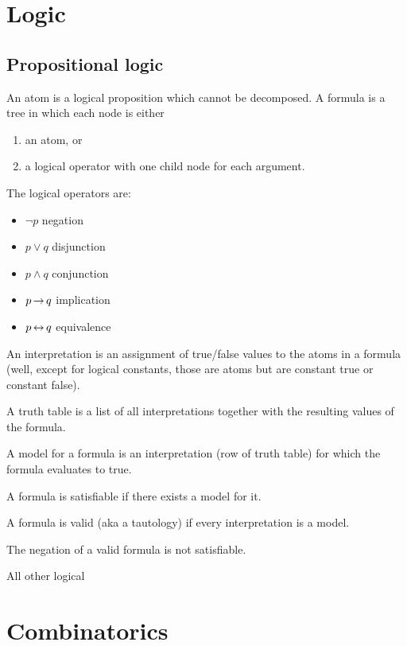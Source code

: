 
\section{Logic}
\subsection{Propositional logic}

\begin{definition*}
  An atom is a logical proposition which cannot be decomposed. A formula is a tree in which each
  node is either
  \begin{enumerate}
  \item an atom, or
  \item a logical operator with one child node for each argument.
  \end{enumerate}
  The logical operators are:
  \begin{itemize}
  \item $\lnot p$ negation
  \item $p \lor q$ disjunction
  \item $p \land q$ conjunction
  \item $p \operatorname{\rightarrow} q$ implication
  \item $p \operatorname{\leftrightarrow} q$ equivalence
  \end{itemize}
  An interpretation is an assignment of true/false values to the atoms in a formula (well, except
  for logical constants, those are atoms but are constant true or constant false).

  A truth table is a list of all interpretations together with the resulting values of the formula.

  A model for a formula is an interpretation (row of truth table) for which the formula evaluates
  to true.

  A formula is satisfiable if there exists a model for it.

  A formula is valid (aka a tautology) if every interpretation is a model.

  The negation of a valid formula is not satisfiable.
\end{definition*}


\begin{theorem*}
  All other logical
\end{theorem*}

\newpage
\section{Combinatorics}

